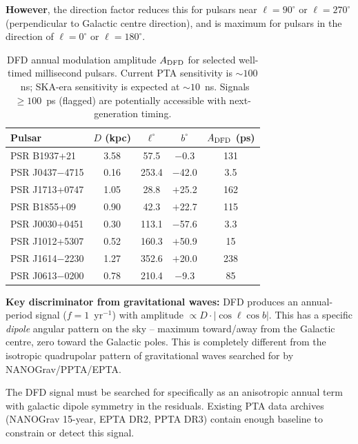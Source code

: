 \documentclass[aps,prd,twocolumn,superscriptaddress,nofootinbib]{revtex4-2}
\begin{document}
\textbf{However}, the direction factor reduces this for pulsars
near $\ell = 90^\circ$ or $\ell = 270^\circ$ (perpendicular to
Galactic centre direction), and is maximum for pulsars in the
direction of $\ell = 0^\circ$ or $\ell = 180^\circ$.

\begin{table}[h]
\caption{DFD annual modulation amplitude $A_{\rm DFD}$ for selected
well-timed millisecond pulsars. Current PTA sensitivity is
$\sim 100$~ns; SKA-era sensitivity is expected at $\sim 10$~ns.
Signals $\geq 100$~ps (flagged) are potentially accessible with
next-generation timing.}
\label{tab:pta_pulsars}
\begin{ruledtabular}
\begin{tabular}{lcccc}
Pulsar & $D$ (kpc) & $\ell^\circ$ & $b^\circ$ &
  $A_{\rm DFD}$ (ps) \\
\hline
PSR B1937+21 & 3.58 & 57.5 & $-$0.3 & 131 \\
PSR J0437$-$4715 & 0.16 & 253.4 & $-$42.0 & 3.5 \\
PSR J1713+0747 & 1.05 & 28.8 & $+$25.2 & 162 \\
PSR B1855+09 & 0.90 & 42.3 & $+$22.7 & 115 \\
PSR J0030+0451 & 0.30 & 113.1 & $-$57.6 & 3.3 \\
PSR J1012+5307 & 0.52 & 160.3 & $+$50.9 & 15 \\
PSR J1614$-$2230 & 1.27 & 352.6 & $+$20.0 & 238 \\
PSR J0613$-$0200 & 0.78 & 210.4 & $-$9.3 & 85 \\
\end{tabular}
\end{ruledtabular}
\end{table}

\textbf{Key discriminator from gravitational waves:}
DFD produces an annual-period signal ($f = 1$~yr$^{-1}$) with
amplitude $\propto D\cdot|\cos\ell\cos b|$. This has a specific
\emph{dipole} angular pattern on the sky -- maximum toward/away
from the Galactic centre, zero toward the Galactic poles. This is
completely different from the isotropic quadrupolar pattern of
gravitational waves searched for by NANOGrav/PPTA/EPTA.

The DFD signal must be searched for specifically as an
anisotropic annual term with galactic dipole symmetry in the
residuals. Existing PTA data archives (NANOGrav 15-year,
EPTA DR2, PPTA DR3) contain enough baseline to constrain
or detect this signal.
\end{document}
